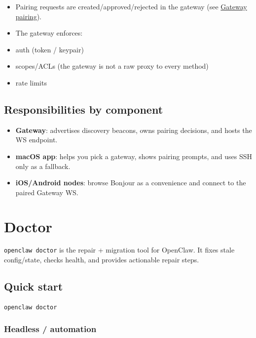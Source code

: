 \begin{itemize}
  \item Pairing requests are created/approved/rejected in the gateway (see \href{/gateway/pairing}{Gateway pairing}).
  \item The gateway enforces:
  \item auth (token / keypair)
  \item scopes/ACLs (the gateway is not a raw proxy to every method)
  \item rate limits
\end{itemize}


\subsection{Responsibilities by component}


\begin{itemize}
  \item \textbf{Gateway}: advertises discovery beacons, owns pairing decisions, and hosts the WS endpoint.
  \item \textbf{macOS app}: helps you pick a gateway, shows pairing prompts, and uses SSH only as a fallback.
  \item \textbf{iOS/Android nodes}: browse Bonjour as a convenience and connect to the paired Gateway WS.
\end{itemize}



\clearpage

\section{Doctor}


\texttt{openclaw doctor} is the repair + migration tool for OpenClaw. It fixes stale
config/state, checks health, and provides actionable repair steps.

\subsection{Quick start}


\begin{lstlisting}[language=bash]
openclaw doctor
\end{lstlisting}


\subsubsection{Headless / automation}


